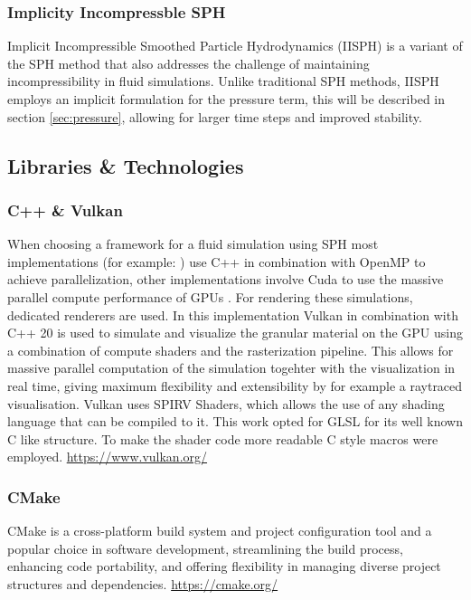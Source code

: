 \documentclass[intern]{cgMA}
\begin{document}
    \subsubsection*{Implicity Incompressble SPH} \label{sec:iisph}
    Implicit Incompressible Smoothed Particle Hydrodynamics (IISPH) is a variant of the SPH method that also addresses the challenge of maintaining incompressibility in fluid simulations. Unlike traditional SPH methods, IISPH employs an implicit formulation for the pressure term, this will be described in section \ref{sec:pressure}, allowing for larger time steps and improved stability.\cite{6570475} %

    \pagebreak
    \subsection{Libraries \& Technologies}

    \subsubsection*{C++ \& Vulkan}
    When choosing a framework for a fluid simulation using SPH most implementations (for example: \cite{splishsplash} \cite{dualsphysics}) use C++ in combination with OpenMP to achieve parallelization, other implementations involve Cuda to use the massive parallel compute performance of GPUs \cite{dualsphysics}. For rendering these simulations, dedicated renderers are used. In this implementation Vulkan in combination with C++ 20 is used to simulate and visualize the granular material on the GPU using a combination of compute shaders and the rasterization pipeline. This allows for massive parallel computation of the simulation togehter with the visualization in real time, giving maximum flexibility and extensibility by for example a raytraced visualisation. Vulkan uses SPIRV Shaders, which allows the use of any shading language that can be compiled to it. This work opted for GLSL for its well known C like structure. To make the shader code more readable C style macros were employed. \url{https://www.vulkan.org/}

    \subsubsection*{CMake}    
    CMake is a cross-platform build system and project configuration tool and a popular choice in software development, streamlining the build process, enhancing code portability, and offering flexibility in managing diverse project structures and dependencies. \url{https://cmake.org/}
\end{document}
